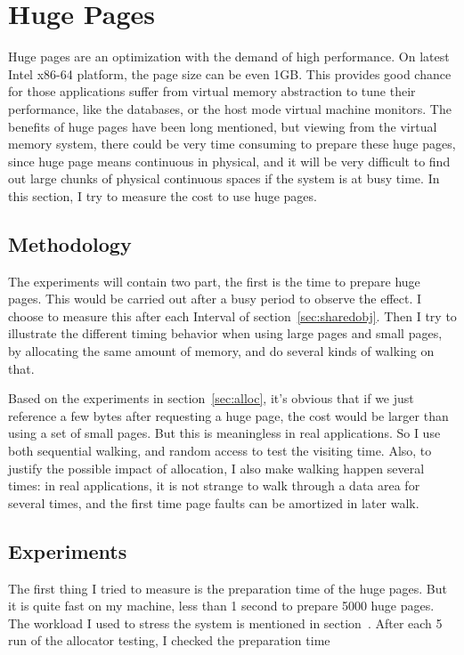 \section{Huge Pages}
	\label{sec:hugepage}
Huge pages are an optimization with the demand of high performance. On latest
Intel x86-64 platform, the page size can be even 1GB. This provides good
chance for those applications suffer from virtual memory abstraction to tune
their performance, like the databases, or the host mode virtual machine monitors.
The benefits of huge pages have been long mentioned, but viewing from the
virtual memory system, there could be very time consuming to prepare these
huge pages, since huge page means continuous in physical, and it will be very
difficult to find out large chunks of physical continuous spaces if the system is
at busy time. In this section, I try to measure the cost to use huge pages.

\subsection{Methodology}
The experiments will contain two part, the first is the time to prepare huge
pages. This would be carried out after a busy period to observe the effect. I
choose to measure this after each Interval of section~\ref{sec:sharedobj}. Then
I try to illustrate the different timing behavior when using large pages and
small pages, by allocating the same amount of memory, and do several kinds of
walking on that.

Based on the experiments in section~\ref{sec:alloc}, it's obvious that if we
just reference a few bytes after requesting a huge page, the cost would be
larger than using a set of small pages. But this is meaningless in real
applications. So I use both sequential walking, and random access to test
the visiting time. Also, to justify the possible impact of allocation, I
also make walking happen several times: in real applications, it is not
strange to walk through a data area for several times, and the first time
page faults can be amortized in later walk.

\subsection{Experiments}
The first thing I tried to measure is the preparation time of the huge pages.
But it is quite fast on my machine, less than 1 second to prepare 5000 huge
pages. The workload I used to stress the system is mentioned in section~\cite{sec:alloc}. After each 5 run of the allocator testing, I checked the preparation time

